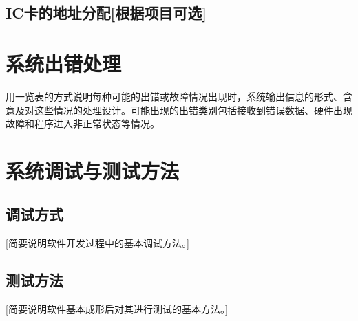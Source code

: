\documentclass[10pt,a4paper,titlepage]{article} %
\begin{document}
\subsection{IC卡的地址分配[根据项目可选]}
\section{系统出错处理}
用一览表的方式说明每种可能的出错或故障情况出现时，系统输出信息的形式、含意及对这些情况的处理设计。可能出现的出错类别包括接收到错误数据、硬件出现故障和程序进入非正常状态等情况。\newline
\section{系统调试与测试方法}
\subsection{调试方式}
[简要说明软件开发过程中的基本调试方法。]\newline
\subsection{测试方法}
[简要说明软件基本成形后对其进行测试的基本方法。]
\end{document}
